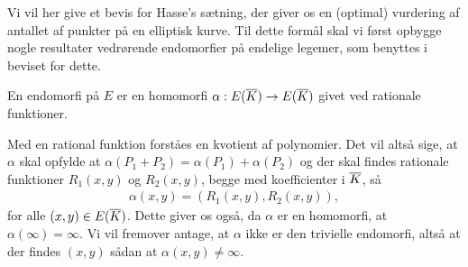 Vi vil her give et bevis for Hasse's sætning, der giver os en 
(optimal) vurdering af antallet af punkter på en elliptisk kurve.
Til dette
formål skal vi først opbygge nogle resultater vedrørende
endomorfier på endelige legemer, som benyttes i beviset for
dette.

\begin{definition}
En endomorfi på $E$ er en homomorfi $\alpha : E(\overline{K}) \to E(\overline{K})$ givet
ved rationale funktioner.
\end{definition}

Med en rational funktion forståes en kvotient af polynomier. Det vil altså sige, 
at $\alpha$ skal opfylde at $\alpha(P_1 + P_2)=\alpha(P_1)+\alpha(P_2)$ 
og der skal findes rationale 
funktioner $R_1(x, y)$ og $R_2(x, y)$, begge med koefficienter i $\overline{K}$, så
\begin{align*}
	\alpha(x, y) = (R_1(x, y), R_2(x, y)),
\end{align*}
for alle $(x, y) \in E(\overline{K})$. Dette giver os også, da $\alpha$ er en homomorfi,
at $\alpha(\infty)=\infty$. Vi vil fremover antage, at $\alpha$ ikke er den 
trivielle endomorfi, altså at der findes $(x, y)$ sådan at $\alpha(x, y) \neq \infty$.

